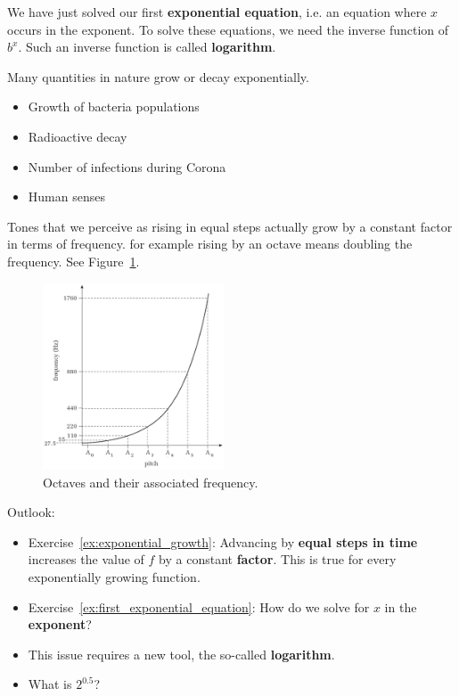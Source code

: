 We have just solved our first \textbf{exponential equation}, i.e. an equation where $x$ occurs in the exponent.
To solve these equations, we need the inverse function of $b^x$.
Such an inverse function is called \textbf{logarithm}.
\begin{tcolorbox}
	Many quantities in nature grow or decay exponentially.
	\begin{itemize}
		\item Growth of bacteria populations
		\item Radioactive decay
		\item Number of infections during Corona
		\item Human senses %
	\end{itemize}
\end{tcolorbox}
\begin{example}
	Tones that we perceive as rising in equal steps actually grow by a constant factor in terms of frequency.
	for example rising by an octave means doubling the frequency.
	See Figure~\ref{fig:octave}.
	\begin{figure}[ht]
		\centering
		\includegraphics[width=0.48\textwidth]{images/octave}
		\caption{Octaves and their associated frequency.}
		\label{fig:octave}
	\end{figure}
\end{example}
\begin{tcolorbox}
	Outlook:
	\begin{itemize}
		\item Exercise~\ref{ex:exponential_growth}: Advancing by \textbf{equal steps in time} increases the value of $f$ by a constant \textbf{factor}.
		This is true for every exponentially growing function.
		\item Exercise~\ref{ex:first_exponential_equation}: How do we solve for $x$ in the \textbf{exponent}?
		\item This issue requires a new tool, the so-called \textbf{logarithm}.
		\item What is $2^{0.5}$?
	\end{itemize}
\end{tcolorbox}

